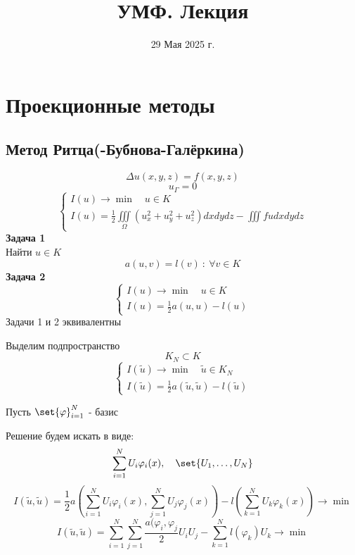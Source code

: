 \documentclass[a4paper]{article}
\DeclarePairedDelimiter\set\{\}
\theoremstyle{definition}
\theoremstyle{remark}
\begin{document}
\title{УМФ. Лекция}
\date{29 Мая 2025 г.}
\maketitle

\section*{\centering Проекционные методы}
\subsection*{\centering Метод Ритца(-Бубнова-Галёркина)}
\begin{equation}
    \Delta u(x,y,z) = f(x,y,z)
\end{equation}
\begin{equation}
    u_{\Gamma} = 0
\end{equation}
\begin{equation}
  \begin{cases}
    I(u) \to \min \quad u \in K \\
    I(u) = \frac{1}{2} \iiint\limits_{\Omega} (u_x^2 + u_y^2 + u_z^2) dx dy dz -
    \iiint f u dxdydz
  \end{cases}
\end{equation}
\textbf{Задача 1}\\
Найти $ u \in K $ 
\[
    a(u,v) = l(v) \ : \ \forall v \in K
\]
\textbf{Задача 2}
\[
  \begin{cases}
    I(u) \to \min \quad u \in K \\
    I(u) = \frac{1}{2} a(u,u) - l(u)
  \end{cases}
\]
Задачи 1 и 2 эквивалентны

 
Выделим подпространство
\[
    K_N \subset K
\]
\[
  \begin{cases}
    I(\widetilde{u}) \to \min \quad \widetilde{u} \in K_N \\
    I(\widetilde{u}) = \frac{1}{2} a(\widetilde{u},\widetilde{u}) - l(\widetilde{u})
  \end{cases}
\]

Пусть $ \set{\varphi}_{i=1}^{N} $ - базис

Решение будем искать в виде:
\[
  \sum_{i=1}^{N} U_i \varphi_i(x), \quad \set{U_1, \dots, U_N}
\]
\[
    I(\widetilde{u}, \widetilde{u}) = \frac{1}{2} a\left(\sum_{i=1}^{N} U_i \varphi_i(x),
  \sum_{j=1}^{N} U_j \varphi_j(x)\right) - l\left(\sum_{k=1}^{N} U_k \varphi_k(x)\right)
  \to \min
\]
\[
    I(\widetilde{u}, \widetilde{u}) = \sum_{i=1}^{N} \sum_{j=1}^{N}
    \frac{a(\varphi_i, \varphi_j}{2} U_i U_j - \sum_{k=1}^{N} l(\varphi_k)
    U_k \to \min
\]
\end{document}
